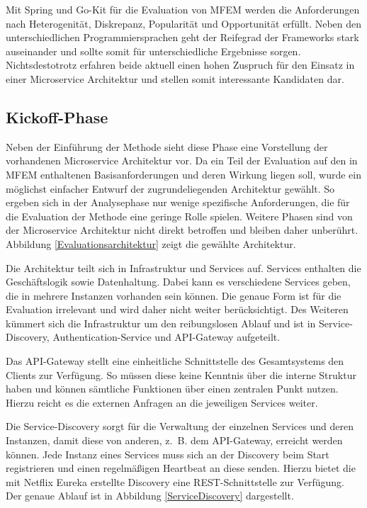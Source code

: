 Mit Spring und Go-Kit für die Evaluation von \ac{MFEM} werden die Anforderungen nach Heterogenität, Diskrepanz, Popularität und Opportunität erfüllt. Neben den unterschiedlichen Programmiersprachen geht der Reifegrad der Frameworks stark auseinander und sollte somit für unterschiedliche Ergebnisse sorgen. Nichtsdestotrotz erfahren 
beide aktuell einen hohen Zuspruch für den Einsatz in einer Microservice Architektur und stellen somit interessante Kandidaten dar.

\subsection{Kickoff-Phase}

Neben der Einführung der Methode sieht diese Phase eine Vorstellung der vorhandenen Microservice Architektur vor.  
Da ein Teil der Evaluation auf den in \ac{MFEM} enthaltenen Basisanforderungen und deren Wirkung liegen soll, wurde ein möglichst einfacher Entwurf der zugrundeliegenden Architektur gewählt. So ergeben sich in der Analysephase nur wenige spezifische Anforderungen, die für die Evaluation der Methode eine geringe Rolle spielen. Weitere Phasen sind von der Microservice Architektur nicht direkt betroffen und bleiben daher unberührt. Abbildung \ref{Evaluationsarchitektur} zeigt die gewählte Architektur.


Die Architektur teilt sich in Infrastruktur und Services auf. Services enthalten die Geschäftslogik sowie Datenhaltung. Dabei kann es verschiedene Services geben, die in mehrere Instanzen vorhanden sein können. Die genaue Form ist für die Evaluation irrelevant und wird daher nicht weiter berücksichtigt. Des Weiteren kümmert sich die Infrastruktur um den reibungslosen Ablauf und ist in Service-Discovery, Authentication-Service und API-Gateway aufgeteilt.

Das API-Gateway stellt eine einheitliche Schnittstelle des Gesamtsystems den Clients zur Verfügung. So müssen diese keine Kenntnis über die interne Struktur haben und können sämtliche Funktionen über einen zentralen Punkt nutzen. Hierzu reicht es die externen Anfragen an die jeweiligen Services weiter.

Die Service-Discovery sorgt für die Verwaltung der einzelnen Services und deren Instanzen, damit diese von anderen, z.~B. dem API-Gateway, erreicht werden können. Jede Instanz eines Services muss sich an der Discovery beim Start registrieren und einen regelmäßigen Heartbeat an diese senden. Hierzu bietet die mit Netflix Eureka erstellte Discovery eine \ac{REST}-Schnittstelle zur Verfügung. Der genaue Ablauf ist in Abbildung \ref{ServiceDiscovery} dargestellt.

